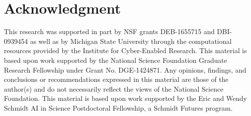\section*{Acknowledgment}

This research was supported in part by NSF grants DEB-1655715 and DBI-0939454 as well as by Michigan State University through the computational resources provided by the Institute for Cyber-Enabled Research.
This material is based upon work supported by the National Science Foundation Graduate Research Fellowship under Grant No. DGE-1424871.
Any opinions, findings, and conclusions or recommendations expressed in this material are those of the author(s) and do not necessarily reflect the views of the National Science Foundation.
This material is based upon work supported by the Eric and Wendy Schmidt AI in Science Postdoctoral Fellowship, a Schmidt Futures program.